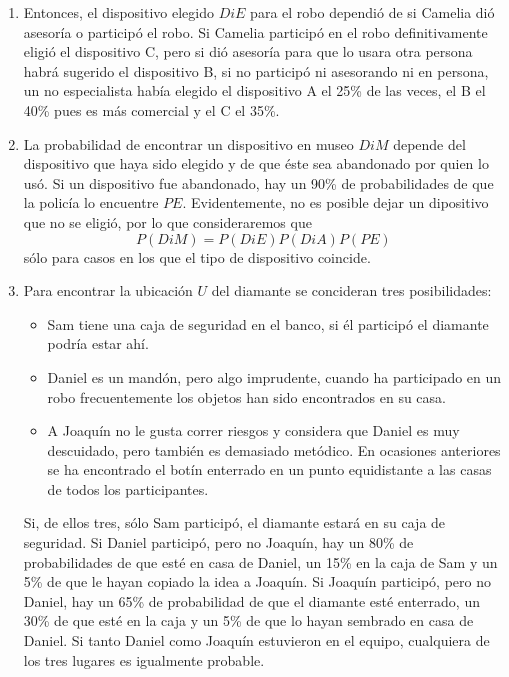 \begin{enumerate}
 \item Entonces, el dispositivo elegido $DiE$ para el robo dependió de si Camelia dió asesoría o participó el robo.  Si Camelia participó en el robo definitivamente eligió el dispositivo C, pero si dió asesoría para que lo usara otra persona habrá sugerido el dispositivo B, si no participó ni asesorando ni en persona, un no especialista había elegido el dispositivo A el 25\% de las veces, el B el 40\% pues es más comercial y el C el 35\%.

 \item La probabilidad de encontrar un dispositivo en museo $DiM$ depende del dispositivo que haya sido elegido y de que éste sea abandonado por quien lo usó.  Si un dispositivo fue abandonado, hay un 90\% de probabilidades de que la policía lo encuentre $PE$.  Evidentemente, no es posible dejar un dipositivo que no se eligió, por lo que consideraremos que $$P(DiM) = P(DiE)P(DiA)P(PE)$$ sólo para casos en los que el tipo de dispositivo coincide.

 \item Para encontrar la ubicación $U$ del diamante se concideran tres posibilidades:
 \begin{itemize}
  \item Sam tiene una caja de seguridad en el banco, si él participó el diamante podría estar ahí.
  \item Daniel es un mandón, pero algo imprudente, cuando ha participado en un robo frecuentemente los objetos han sido encontrados en su casa.
  \item A Joaquín no le gusta correr riesgos y considera que Daniel es muy descuidado, pero también es demasiado metódico.  En ocasiones anteriores se ha encontrado el botín enterrado en un punto equidistante a las casas de todos los participantes.
 \end{itemize}
 Si, de ellos tres, sólo Sam participó, el diamante estará en su caja de seguridad.  Si Daniel participó, pero no Joaquín, hay un 80\% de probabilidades de que esté en casa de Daniel, un 15\% en la caja de Sam y un 5\% de que le hayan copiado la idea a Joaquín.  Si Joaquín participó, pero no Daniel, hay un 65\% de probabilidad de que el diamante esté enterrado, un 30\% de que esté en la caja y un 5\% de que lo hayan sembrado en casa de Daniel.  Si tanto Daniel como Joaquín estuvieron en el equipo, cualquiera de los tres lugares es igualmente probable.

\end{enumerate}



